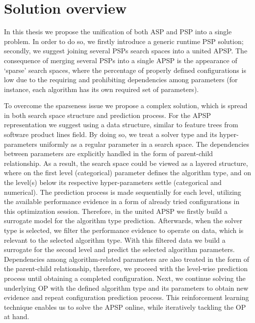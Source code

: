 \section{Solution overview}
In this thesis we propose the unification of both ASP and PSP into a single problem. In order to do so, we firstly introduce a generic runtime PSP solution; secondly, we suggest joining several PSPs search spaces into a united APSP. The consequence of merging several PSPs into a single APSP is the appearance of `sparse' search spaces, where the percentage of properly defined configurations is low due to the requiring and prohibiting dependencies among parameters (for instance, each algorithm has its own required set of parameters).

To overcome the sparseness issue we propose a complex solution, which is spread in both search space structure and prediction process. For the APSP representation we suggest using a data structure, similar to feature trees from software product lines field. By doing so, we treat a solver type and its hyper-parameters uniformly as a regular parameter in a search space. The dependencies between parameters are explicitly handled in the form of parent-child relationship. As a result, the search space could be viewed as a layered structure, where on the first level (categorical) parameter defines the algorithm type, and on the level(s) below its respective hyper-parameters settle (categorical and numerical). The prediction process is made sequentially for each level, utilizing the available performance evidence in a form of already tried configurations in this optimization session. Therefore, in the united APSP we firstly build a surrogate model for the algorithm type prediction. Afterwards, when the solver type is selected, we filter the performance evidence to operate on data, which is relevant to the selected algorithm type. With this filtered data we build a surrogate for the second level and predict the selected algorithm parameters. Dependencies among algorithm-related parameters are also treated in the form of the parent-child relationship, therefore, we proceed with the level-wise prediction process until obtaining a completed configuration. Next, we continue solving the underlying OP with the defined algorithm type and its parameters to obtain new evidence and repeat configuration prediction process. This reinforcement learning technique enables us to solve the APSP online, while iteratively tackling the OP at hand.

